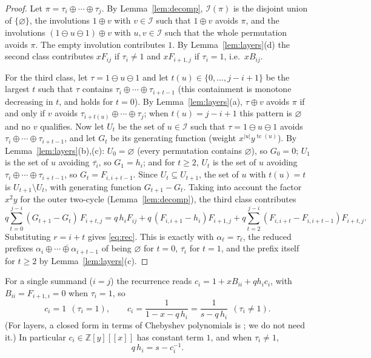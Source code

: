 \documentclass[11pt]{amsart}
\theoremstyle{definition}
\DeclareMathOperator{\tc}{tc}
\newcommand{\I}{\mathcal{I}}
\newcommand{\Z}{\mathbb{Z}}
\newcommand{\ds}{\oplus}
\newcommand{\sk}{\ominus}
\newcommand{\red}[1]{\overline{#1}}
\begin{document}
\begin{proof}
Let $\pi=\tau_i\ds\cdots\ds\tau_j$. By Lemma~\ref{lem:decomp}, $\I(\pi)$ is the disjoint union of $\{\varnothing\}$, the involutions $1\ds v$ with $v\in\I$ such that $1\ds v$ avoids $\pi$, and the involutions $(1\sk u\sk1)\ds v$ with $u,v\in\I$ such that the whole permutation avoids $\pi$. The empty involution contributes $1$. By Lemma~\ref{lem:layers}(d) the second class contributes $xF_{ij}$ if $\tau_i\ne1$ and $xF_{i+1,j}$ if $\tau_i=1$, i.e.\ $xB_{ij}$.

For the third class, let $\tau=1\sk u\sk1$ and let $t(u)\in\{0,\dots,j-i+1\}$ be the largest $t$ such that $\tau$ contains $\tau_i\ds\cdots\ds\tau_{i+t-1}$ (this containment is monotone decreasing in $t$, and holds for $t=0$). By Lemma~\ref{lem:layers}(a), $\tau\ds v$ avoids $\pi$ if and only if $v$ avoids $\tau_{i+t(u)}\ds\cdots\ds\tau_j$; when $t(u)=j-i+1$ this pattern is $\varnothing$ and no $v$ qualifies. Now let $U_t$ be the set of $u\in\I$ such that $\tau=1\sk u\sk 1$ avoids $\tau_i\ds\cdots\ds\tau_{i+t-1}$, and let $G_t$ be its generating function (weight $x^{|u|}y^{\tc(u)}$). By Lemma~\ref{lem:layers}(b),(c): $U_0=\varnothing$ (every permutation contains $\varnothing$), so $G_0=0$; $U_1$ is the set of $u$ avoiding $\red{\tau_i}$, so $G_1=h_i$; and for $t\ge2$, $U_t$ is the set of $u$ avoiding $\tau_i\ds\cdots\ds\tau_{i+t-1}$, so $G_t=F_{i,i+t-1}$. Since $U_t\subseteq U_{t+1}$, the set of $u$ with $t(u)=t$ is $U_{t+1}\setminus U_t$, with generating function $G_{t+1}-G_t$. Taking into account the factor $x^2y$ for the outer two-cycle (Lemma~\ref{lem:decomp}), the third class contributes
\[
q\sum_{t=0}^{j-i}(G_{t+1}-G_t)\,F_{i+t,j}
= q\,h_iF_{ij}+q\,(F_{i,i+1}-h_i)F_{i+1,j}+q\sum_{t=2}^{j-i}(F_{i,i+t}-F_{i,i+t-1})F_{i+t,j}.
\]
Substituting $r=i+t$ gives \eqref{eq:rec}. This is exactly \cite[Theorem 3.3]{EggeMansour2006} with $\alpha_\ell=\tau_{\ell}$, the reduced prefixes $\red{\alpha_i\ds\cdots\ds\alpha_{i+t-1}}$ of \cite[Definition 3.2]{EggeMansour2006} being $\varnothing$ for $t=0$, $\red{\tau_i}$ for $t=1$, and the prefix itself for $t\ge2$ by Lemma~\ref{lem:layers}(c).
\end{proof}

For a single summand ($i=j$) the recurrence reads $c_i=1+xB_{ii}+qh_ic_i$, with $B_{ii}=F_{i+1,i}=0$ when $\tau_i=1$, so
\begin{equation}\label{eq:single}
c_i=1\ \ (\tau_i=1),\qquad c_i=\frac{1}{1-x-q\,h_i}=\frac1{s-q\,h_i}\ \ (\tau_i\ne1).
\end{equation}
(For layers, a closed form in terms of Chebyshev polynomials is \cite[Theorem 3.8]{EggeMansour2006}; we do not need it.) In particular $c_i\in\Z[y][[x]]$ has constant term $1$, and when $\tau_i\ne1$,
\begin{equation}\label{eq:qh}
q\,h_i=s-c_i^{-1}.
\end{equation}
\end{document}
